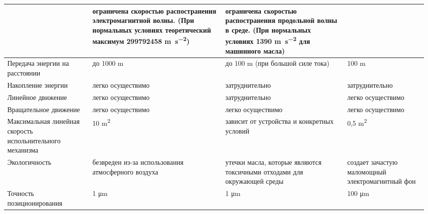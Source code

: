 \begin{longtable}[htpb]{|p{3.5cm}||p{3.5cm}|p{3.5cm}|p{3.5cm}|}
                                & ограничена скоростью распостранения электромагнитной волны.
    (При нормальных условиях теоретический максимум
    \num{299792458} \si{\metre\per\square\second})
                                & ограничена скоростью распостранения продольной волны в среде.
    (При нормальных условиях
    \num{1390} \si{\metre\per\square\second}
    для машинного масла)                                                                                                                                                                                                     \\
    \hline
    Передача энергии на расстоянии
                                & до 1000 \si{\metre}                                           & до 100 \si{\metre} (при большой силе тока)                              & 100 \si{\metre}                                  \\
    \hline
    Накопление энергии
                                & легко осуществимо                                             & затруднительно                                                          & затруднительно                                   \\
    \hline
    Линейное движение
                                & легко осуществимо                                             & затруднительно                                                          & легко осуществимо                                \\

    \hline
    Вращательное движение
                                & легко осуществимо                                             & легко осуществимо                                                       & легко осуществимо                                \\
    \hline
    Максимальная линейная скорость испольнительного механизма
                                & 10 \si{\square\metre}
                                & зависит от устройства и конкретных условий
                                & 0,5 \si{\square\metre}                                                                                                                                                                     \\
    \hline
    Экологичность               & безвреден из-за использования атмосферного воздуха            & утечки масла, которые являются токсичными отходами для окружающей среды & создает зачастую маломощный электромагнитный фон \\
    \hline
    Точность позиционирования   & 1 \si{\micro\metre}                                           & 1 \si{\micro\metre}                                                     & 100 \si{\micro\metre}                            \\
    \hline
\end{longtable}
\normalsize
\endgroup


